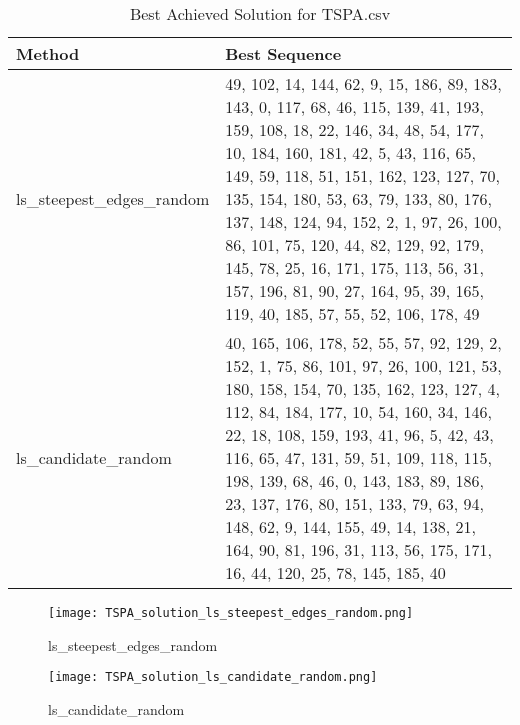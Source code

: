 \begin{table}[H] %
\centering
\caption{Best Achieved Solution for TSPA.csv}
\label{tab:tsbp_best_sequence}
\begin{tabular}{|p{0.25\linewidth}|p{0.75\linewidth}|} %
\hline
\textbf{Method} & \textbf{Best Sequence} \\
\hline
ls\_steepest\_edges\_random & 49, 102, 14, 144, 62, 9, 15, 186, 89, 183, 143, 0, 117, 68, 46, 115, 139, 41, 193, 159, 108, 18, 22, 146, 34, 48, 54, 177, 10, 184, 160, 181, 42, 5, 43, 116, 65, 149, 59, 118, 51, 151, 162, 123, 127, 70, 135, 154, 180, 53, 63, 79, 133, 80, 176, 137, 148, 124, 94, 152, 2, 1, 97, 26, 100, 86, 101, 75, 120, 44, 82, 129, 92, 179, 145, 78, 25, 16, 171, 175, 113, 56, 31, 157, 196, 81, 90, 27, 164, 95, 39, 165, 119, 40, 185, 57, 55, 52, 106, 178, 49 \\
\hline
ls\_candidate\_random & 40, 165, 106, 178, 52, 55, 57, 92, 129, 2, 152, 1, 75, 86, 101, 97, 26, 100, 121, 53, 180, 158, 154, 70, 135, 162, 123, 127, 4, 112, 84, 184, 177, 10, 54, 160, 34, 146, 22, 18, 108, 159, 193, 41, 96, 5, 42, 43, 116, 65, 47, 131, 59, 51, 109, 118, 115, 198, 139, 68, 46, 0, 143, 183, 89, 186, 23, 137, 176, 80, 151, 133, 79, 63, 94, 148, 62, 9, 144, 155, 49, 14, 138, 21, 164, 90, 81, 196, 31, 113, 56, 175, 171, 16, 44, 120, 25, 78, 145, 185, 40 \\
\hline
\end{tabular}
\end{table}

\begin{figure}[!htbp]
\centering
\texttt{[image: TSPA\_solution\_ls\_steepest\_edges\_random.png]}
\caption{\label{fig:frog}ls\_steepest\_edges\_random}
\end{figure}

\begin{figure}[!htbp]
\centering
\texttt{[image: TSPA\_solution\_ls\_candidate\_random.png]}
\caption{\label{fig:frog}ls\_candidate\_random}
\end{figure}